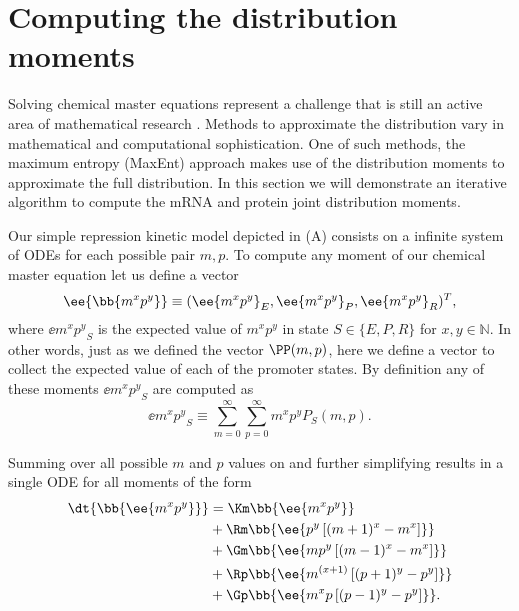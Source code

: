 \section{Computing the distribution moments}

Solving chemical master equations represent a challenge that is still an active
area of mathematical research \cite{Dinh2016}. Methods to approximate the
distribution vary in mathematical and computational sophistication. One of such
methods, the maximum entropy (MaxEnt) approach makes use of the distribution
moments to approximate the full distribution. In this section we will
demonstrate an iterative algorithm to compute the mRNA and protein joint
distribution moments.

Our simple repression kinetic model depicted in (A)
consists on a infinite system of ODEs for each possible pair $m, p$. To
compute any moment of our chemical master equation let us define a vector
\begin{equation}
	\ee{\bb{m^x p^y}} \equiv (\ee{m^x p^y}_E, \ee{m^x p^y}_P, \ee{m^x p^y}_R)^T,
\end{equation}
where $\ee{m^x p^y}_S$ is the expected value of $m^x p^y$ in state $S \in \{E,
P, R\}$ for $x, y \in \mathbb{N}$. In other words, just as we defined the vector
$\PP(m, p)$, here we define a vector to collect the expected value of each of
the promoter states. By definition any of these moments $\ee{m^x p^y}_S$ are
computed as
\begin{equation}
  \ee{m^x p^y}_S \equiv \sum_{m=0}^\infty \sum_{p=0}^\infty m^x p^y P_S(m, p).
  \label{eq_mom_def}
\end{equation}

Summing over all possible $m$ and $p$ values on  and further simplifying results in a single ODE for all moments of the
form
\begin{equation}
  \begin{aligned}
    \dt{\bb{\ee{m^x p^y}}} &=
    \Km \bb{\ee{m^x p^y}}\\
    &+ \Rm \bb{\ee{p^y \left[ (m + 1)^x -m^x \right]}}\\
    &+ \Gm \bb{\ee{m p^y \left[ (m - 1)^x - m^x \right]}}\\
    &+ \Rp \bb{\ee{m^{(x + 1)} \left[ (p + 1)^y - p^y \right]}}\\
    &+ \Gp \bb{\ee{m^x p \left[ (p - 1)^y - p^y \right]}}.
    \label{eq_gral_mom}
  \end{aligned}
\end{equation}

